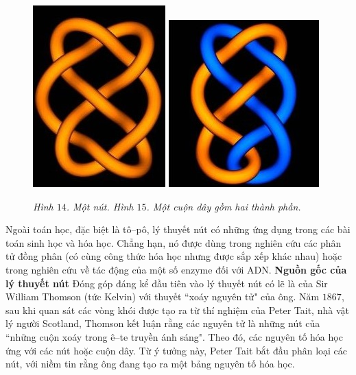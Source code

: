\begin{multicols}{2}
	\begin{figure}[H]
		\vspace*{-10pt}
		\centering
		\captionsetup{labelformat= empty, justification=centering}
		\includegraphics[height= 0.4\linewidth]{fig_14}\quad
		\includegraphics[height= 0.4\linewidth]{fig_15}
		\caption{\small\textit{\color{duongvaotoanhoc}Hình $14$. Một nút. Hình $15$. Một cuộn dây gồm hai thành phần.}}
		\vspace*{-10pt}
	\end{figure}
	Ngoài toán học, đặc biệt là tô--pô, lý thuyết nút có những ứng dụng trong các bài toán sinh học và hóa học. Chẳng hạn, nó được dùng trong nghiên cứu các phân tử đồng phân (có cùng công thức hóa học nhưng được sắp xếp khác nhau) hoặc trong nghiên cứu về tác động của một số enzyme đối với ADN.
	\vskip 0.1cm
	\textbf{\color{duongvaotoanhoc}Nguồn gốc của lý thuyết nút}
	\vskip 0.1cm
	Đóng góp đáng kể đầu tiên vào lý thuyết nút có lẽ là của Sir William Thomson (tức Kelvin) với thuyết ``xoáy nguyên tử" của ông. Năm $1867$, sau khi quan sát các vòng khói được tạo ra từ thí nghiệm của Peter Tait, nhà vật lý người Scotland, Thomson kết luận rằng các nguyên tử là những nút của ``những cuộn xoáy trong ê--te truyền ánh sáng". Theo đó, các nguyên tố hóa học ứng với các nút hoặc cuộn dây. Từ ý tưởng này, Peter Tait bắt đầu phân loại các nút, với niềm tin rằng ông đang tạo ra một bảng nguyên tố hóa học.
	\begin{tBox}
		\begin{figure}

\end{figure}
\end{tBox}
\end{multicols}
